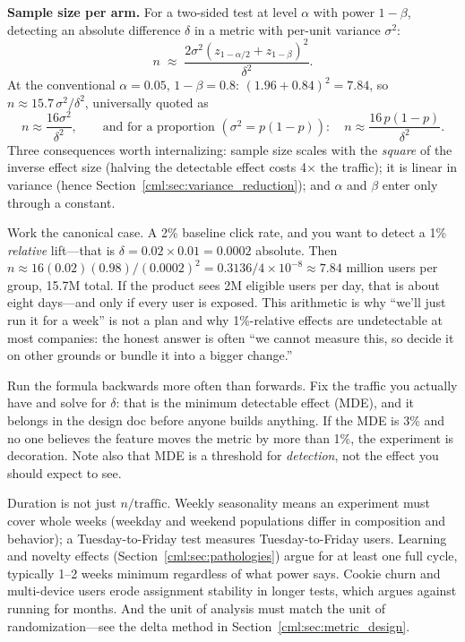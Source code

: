 \begin{mathresult}
\textbf{Sample size per arm.} For a two-sided test at level $\alpha$ with power $1-\beta$, detecting an absolute difference $\delta$ in a metric with per-unit variance $\sigma^2$:
\begin{equation*}
n \;\approx\; \frac{2\sigma^2\left(z_{1-\alpha/2} + z_{1-\beta}\right)^2}{\delta^2}.
\end{equation*}
At the conventional $\alpha=0.05$, $1-\beta=0.8$: $(1.96 + 0.84)^2 = 7.84$, so $n \approx 15.7\,\sigma^2/\delta^2$, universally quoted as
\begin{equation*}
n \approx \frac{16\sigma^2}{\delta^2}, \qquad\text{and for a proportion } (\sigma^2 = p(1-p)):\quad n \approx \frac{16\,p(1-p)}{\delta^2}.
\end{equation*}
Three consequences worth internalizing: sample size scales with the \emph{square} of the inverse effect size (halving the detectable effect costs 4$\times$ the traffic); it is linear in variance (hence Section~\ref{cml:sec:variance_reduction}); and $\alpha$ and $\beta$ enter only through a constant.
\end{mathresult}

Work the canonical case. A 2\% baseline click rate, and you want to detect a 1\% \emph{relative} lift---that is $\delta = 0.02 \times 0.01 = 0.0002$ absolute. Then $n \approx 16 (0.02)(0.98)/(0.0002)^2 = 0.3136/4\times10^{-8} \approx 7.84$ million users per group, 15.7M total. If the product sees 2M eligible users per day, that is about eight days---and only if every user is exposed. This arithmetic is why ``we'll just run it for a week'' is not a plan and why 1\%-relative effects are undetectable at most companies: the honest answer is often ``we cannot measure this, so decide it on other grounds or bundle it into a bigger change.''

Run the formula backwards more often than forwards. Fix the traffic you actually have and solve for $\delta$: that is the minimum detectable effect (MDE), and it belongs in the design doc before anyone builds anything. If the MDE is 3\% and no one believes the feature moves the metric by more than 1\%, the experiment is decoration. Note also that MDE is a threshold for \emph{detection}, not the effect you should expect to see.

Duration is not just $n/\text{traffic}$. Weekly seasonality means an experiment must cover whole weeks (weekday and weekend populations differ in composition and behavior); a Tuesday-to-Friday test measures Tuesday-to-Friday users. Learning and novelty effects (Section~\ref{cml:sec:pathologies}) argue for at least one full cycle, typically 1--2 weeks minimum regardless of what power says. Cookie churn and multi-device users erode assignment stability in longer tests, which argues against running for months. And the unit of analysis must match the unit of randomization---see the delta method in Section~\ref{cml:sec:metric_design}.

